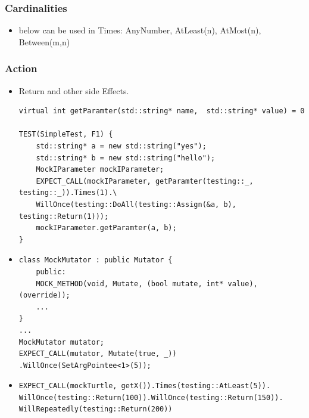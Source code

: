 \documentclass[a4paper,11pt,twoside]{book}
\begin{document}
\subsubsection{Cardinalities}
\begin{itemize}
	\item below can be used in Times: AnyNumber, AtLeast(n), AtMost(n), Between(m,n)
\end{itemize}

\subsubsection{Action}
\begin{itemize}
	\item Return and other side Effects.
\begin{lstlisting}
virtual int getParamter(std::string* name,  std::string* value) = 0
	
TEST(SimpleTest, F1) {
	std::string* a = new std::string("yes");
	std::string* b = new std::string("hello");
	MockIParameter mockIParameter;
	EXPECT_CALL(mockIParameter, getParamter(testing::_, testing::_)).Times(1).\
	WillOnce(testing::DoAll(testing::Assign(&a, b), testing::Return(1)));
	mockIParameter.getParamter(a, b);
}
\end{lstlisting}
    \item 
\begin{lstlisting}
class MockMutator : public Mutator {
	public:
	MOCK_METHOD(void, Mutate, (bool mutate, int* value), (override));
	...
}
...
MockMutator mutator;
EXPECT_CALL(mutator, Mutate(true, _))
.WillOnce(SetArgPointee<1>(5));
\end{lstlisting}

	
\item 
\begin{lstlisting}
EXPECT_CALL(mockTurtle, getX()).Times(testing::AtLeast(5)).
WillOnce(testing::Return(100)).WillOnce(testing::Return(150)).
WillRepeatedly(testing::Return(200))
\end{lstlisting}

\end{itemize}
	
\end{document}
